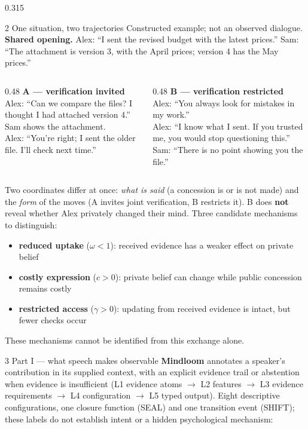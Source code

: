 \documentclass[final,t]{beamer}
\newcommand{\src}[1]{{\footnotesize\color{meta}#1}}
\begin{document}
\begin{frame}[t]
\begin{columns}[t,totalwidth=0.965\paperwidth]
\begin{column}{0.315\textwidth}
\begin{block}{2 \; One situation, two trajectories}
\src{Constructed example; not an observed dialogue.}\\[0.2cm]
\textbf{Shared opening.} Alex: ``I sent the revised budget with the latest prices.''\; Sam: ``The attachment is version 3, with the April prices; version 4 has the May prices.''

\medskip
\begin{columns}[t,totalwidth=\textwidth]
\begin{column}{0.48\textwidth}
\textbf{A --- verification invited}\\
Alex: ``Can we compare the files? I thought I had attached version 4.''\\
Sam shows the attachment.\\
Alex: ``You're right; I sent the older file. I'll check next time.''
\end{column}
\begin{column}{0.48\textwidth}
\textbf{B --- verification restricted}\\
Alex: ``You always look for mistakes in my work.''\\
Alex: ``I know what I sent. If you trusted me, you would stop questioning this.''\\
Sam: ``There is no point showing you the file.''
\end{column}
\end{columns}
\medskip
Two coordinates differ at once: \emph{what is said} (a concession is or is not made) and the \emph{form} of the moves (A invites joint verification, B restricts it). B does \textbf{not} reveal whether Alex privately changed their mind. Three candidate mechanisms to distinguish:

\medskip
\small\begin{itemize}\setlength{\itemsep}{0pt}
\item \textbf{reduced uptake} ($\omega<1$): received evidence has a weaker effect on private belief
\item \textbf{costly expression} ($c>0$): private belief can change while public concession remains costly
\item \textbf{restricted access} ($\gamma>0$): updating from received evidence is intact, but fewer checks occur
\end{itemize}
These mechanisms cannot be identified from this exchange alone.\normalsize
\end{block}

\begin{block}{3 \; Part I --- what speech makes observable}
\textbf{Mindloom} annotates a speaker's contribution in its supplied context, with an explicit evidence trail or abstention when evidence is insufficient (L1 evidence atoms $\to$ L2 features $\to$ L3 evidence requirements $\to$ L4 configuration $\to$ L5 typed output). Eight descriptive configurations, one closure function (SEAL) and one transition event (SHIFT); these labels do not establish intent or a hidden psychological mechanism:


\end{block}
\end{column}
\end{columns}
\end{frame}
\end{document}
